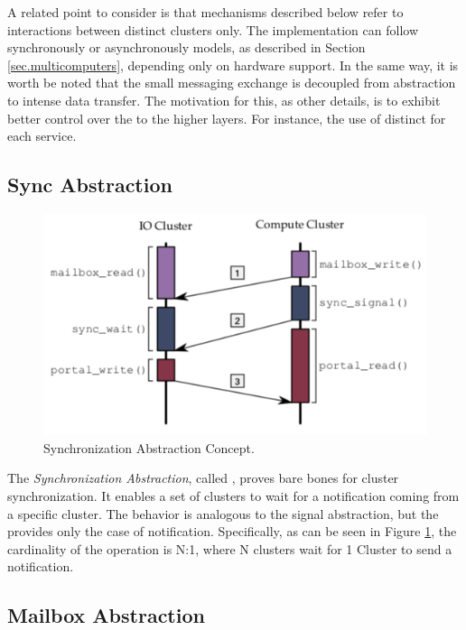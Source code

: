 	A related point to consider is that mechanisms described below refer
	to interactions between distinct clusters only.
	The implementation can follow synchronously or asynchronously models,
	as described in Section \ref{sec.multicomputers}, depending only on hardware support.
	In the same way, it is worth be noted that the small messaging exchange
	is decoupled from abstraction to intense data transfer.
	The motivation for this, as other details, is to exhibit better control
	over the \qos to the higher layers.
	For instance, the use of distinct \nocs for each service.

		\subsection{Sync Abstraction}
		\label{sec.sync-abs}

			\begin{figure}[h]
				\centering
				\includegraphics[width=.7\textwidth]{images/conceptual-sync.png}

				\caption{
					Synchronization Abstraction Concept.
				}\par
				\label{fig.conpt_sync}
			\end{figure}

			The \textit{Synchronization Abstraction}, called \sync, proves bare bones
			for cluster synchronization.
			It enables a set of clusters to wait for a notification coming from a
			specific cluster.
			The behavior is analogous to the \posix signal abstraction, but the \sync
			provides only the case of notification.
			Specifically, as can be seen in Figure \ref{fig.conpt_sync}, the
			cardinality of the operation is N:1, where N clusters wait for 1 Cluster
			to send a notification.

		\subsection{Mailbox Abstraction}
		\label{sec.mailbox-abs}

